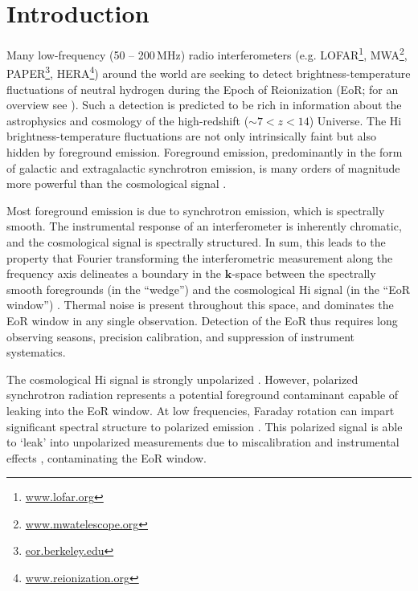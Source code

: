\documentclass[twocolumn, trackchanges]{aastex61}
\begin{document}

\section{Introduction}
\label{sec:intro}

Many low-frequency (50 -- 200\,MHz) radio interferometers
(e.g. LOFAR\footnote{\url{www.lofar.org}},
MWA\footnote{\url{www.mwatelescope.org}},
PAPER\footnote{\url{eor.berkeley.edu}},
HERA\footnote{\url{www.reionization.org}}) around the world are seeking to
detect brightness-temperature fluctuations of neutral hydrogen during the Epoch
of Reionization (EoR; for an overview see \citet{Furlanetto06}).  Such a
detection is predicted to be rich in information about the astrophysics and
cosmology of the high-redshift ($\sim 7 < z < 14$) Universe.  The {\sc Hi}
brightness-temperature fluctuations are not only intrinsically faint but also
hidden by foreground emission. Foreground emission, predominantly in the form of
galactic and extragalactic synchrotron emission, is many orders of magnitude
more powerful than the cosmological signal \citep[e.g.][]{Bernardi09, Pober13,
  Dillon14}.

Most foreground emission is due to synchrotron emission, which is spectrally
smooth. The instrumental response of an interferometer is inherently chromatic,
and the cosmological signal is spectrally structured. In sum, this leads to the
property that Fourier transforming the interferometric measurement along the
frequency axis delineates a boundary in the $\mathbf{k}$-space between the
spectrally smooth foregrounds (in the ``wedge'') and the cosmological {\sc Hi}
signal (in the ``EoR window'') \citep{Datta.10, Morales.12, Parsons.12a,
  Parsons.12b, Trott.12, Vedantham.12, Pober13, Thyagarajan.13, Pober.14,
  Liu.14a, Liu.14b, Dillon.15a, Dillon.15b, Nithya.15b, Nithya.15a}.  Thermal
noise is present throughout this space, and dominates the EoR window in any
single observation.  Detection of the EoR thus requires long observing seasons,
precision calibration, and suppression of instrument systematics.

The cosmological {\sc Hi} signal is strongly unpolarized
\citep{Mishra17}. However, polarized synchrotron radiation represents a
potential foreground contaminant capable of leaking into the EoR window. At low
frequencies, Faraday rotation can impart significant spectral structure to
polarized emission \citep[e.g.][]{Moore13}. This polarized signal is able to
`leak' into unpolarized measurements due to miscalibration and instrumental
effects \citep{Carozzi.09, Geil.11, Moore13, Asad15, Asad.16, Kohn16,
  Nunhokee.17}, contaminating the EoR window.
\end{document}
